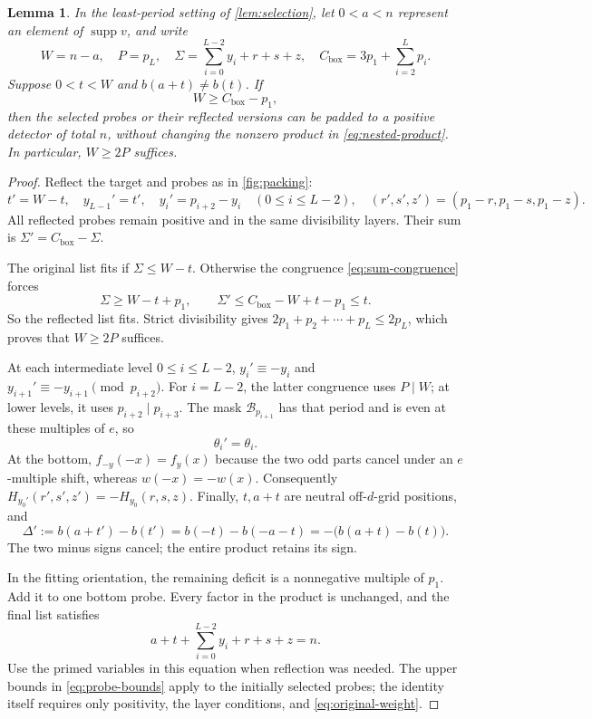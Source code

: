 \documentclass[11pt,a4paper]{amsart}
\numberwithin{equation}{section}
\theoremstyle{plain}
\newtheorem{lemma}[theorem]{Lemma}
\theoremstyle{definition}
\newcommand{\supp}{\operatorname{supp}}
\begin{document}
\begin{lemma}\label{lem:packing}
In the least-period setting of \cref{lem:selection}, let \(0<a<n\)
represent an element of \(\supp v\), and write
\begin{equation}\label{eq:packing-ledger}
W=n-a,\quad P=p_L,\quad
\Sigma=\sum_{i=0}^{L-2}y_i+r+s+z,\quad
C_{\mathrm{box}}=3p_1+\sum_{i=2}^{L}p_i.
\end{equation}
Suppose \(0<t<W\) and \(b(a+t)\ne b(t)\).  If
\begin{equation}\label{eq:packing-budget}
W\ge C_{\mathrm{box}}-p_1,
\end{equation}
then the selected probes or their reflected versions can be padded to a
positive detector of total \(n\), without changing the nonzero product in
\eqref{eq:nested-product}.  In particular, \(W\ge2P\) suffices.
\end{lemma}
\begin{proof}
Reflect the target and probes as in \cref{fig:packing}:
\[
t'=W-t,\quad y_{L-1}'=t',\quad
y_i'=p_{i+2}-y_i\quad(0\le i\le L-2),\quad
(r',s',z')=(p_1-r,p_1-s,p_1-z).
\]
All reflected probes remain positive and in the same divisibility layers.
Their sum is \(\Sigma'=C_{\mathrm{box}}-\Sigma\).

The original list fits if \(\Sigma\le W-t\).  Otherwise the congruence
\eqref{eq:sum-congruence} forces
\[
\Sigma\ge W-t+p_1,
\qquad
\Sigma'\le C_{\mathrm{box}}-W+t-p_1\le t.
\]
So the reflected list fits.  Strict divisibility gives
\(2p_1+p_2+\cdots+p_L\le2p_L\), which proves that \(W\ge2P\) suffices.

At each intermediate level \(0\le i\le L-2\),
\(y_i'\equiv-y_i\) and \(y_{i+1}'\equiv-y_{i+1}\pmod{p_{i+2}}\).
For \(i=L-2\), the latter congruence uses \(P\mid W\); at lower levels,
it uses \(p_{i+2}\mid p_{i+3}\).
The mask \(\mathcal B_{p_{i+1}}\) has that period and is even at these multiples of
\(e\), so
\[
\theta_i'=\theta_i.
\]
At the bottom,
\(f_{-y}(-x)=f_y(x)\) because the two odd parts cancel under an
\(e\)-multiple shift, whereas \(w(-x)=-w(x)\).  Consequently
\(H_{y_0'}(r',s',z')=-H_{y_0}(r,s,z)\).
Finally, \(t,a+t\) are neutral off-\(d\)-grid positions, and
\[
\Delta':=b(a+t')-b(t')
=b(-t)-b(-a-t)
=-\bigl(b(a+t)-b(t)\bigr).
\]
The two minus signs cancel; the entire product retains its sign.

In the fitting orientation, the remaining deficit is a nonnegative
multiple of \(p_1\).  Add it to one bottom probe.  Every factor in the
product is unchanged, and the final list satisfies
\begin{equation}\label{eq:original-weight}
a+t+\sum_{i=0}^{L-2}y_i+r+s+z=n.
\end{equation}
Use the primed variables in this equation when reflection was needed.
The upper bounds in \eqref{eq:probe-bounds} apply to the initially selected
probes; the identity itself requires only positivity, the layer conditions,
and \eqref{eq:original-weight}.
\end{proof}
\end{document}
